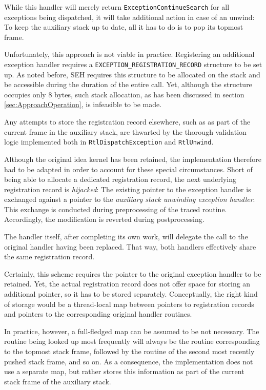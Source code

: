 While this handler will merely return \verb|ExceptionContinueSearch| for all 
exceptions being dispatched, it will take additional action in case of an unwind: To
keep the auxiliary stack up to date, all it has to do is to pop its topmost
frame. 

Unfortunately, this approach is not viable in practice. Registering an additional
exception handler requires a \verb|EXCEPTION_REGISTRATION_RECORD| structure to be set up.
As noted before, SEH requires this structure to be allocated on the stack and
be accessible during the duration of the entire call. Yet, although the structure
occupies only 8 bytes, such stack allocation, as has been discussed
in section \ref{sec:ApproachOperation}, is infeasible to be made. 

Any attempts to store the registration record elsewhere, such as as part of the current 
frame in the auxiliary stack, are thwarted by the thorough validation logic
implemented both in \verb|RtlDispatchException| and \verb|RtlUnwind|.

Although the original idea kernel has been retained, the implementation therefore had to
be adapted in order to account for these special circumstances. Short of being able to 
allocate a dedicated registration record, the next underlying registration 
record is \emph{hijacked}: The existing pointer to the exception handler is 
exchanged against a pointer to the \emph{auxiliary stack unwinding exception handler}. 
This exchange is conducted during preprocessing of the traced routine. Accordingly, 
the modification is reverted during postprocessing. 

The handler itself, after completing its own work, will delegate the call to the original
handler having been replaced. That way, both handlers effectively share the same 
registration record. 

Certainly, this scheme requires the pointer to the original exception handler to 
be retained. Yet, the actual registration record does not offer space for storing an
additional pointer, so it has to be stored separately. Conceptually, the right kind 
of storage would be a thread-local map between pointers to registration records and 
pointers to the corresponding original handler routines.

In practice, however, a full-fledged map can be assumed to be not necessary. The
routine being looked up most frequently will always be the routine corresponding
to the topmost stack frame, followed by the routine of the second most recently
pushed stack frame, and so on. As a consequence, the implementation does not use
a separate map, but rather stores this information as part of the current stack 
frame of the auxiliary stack. 

